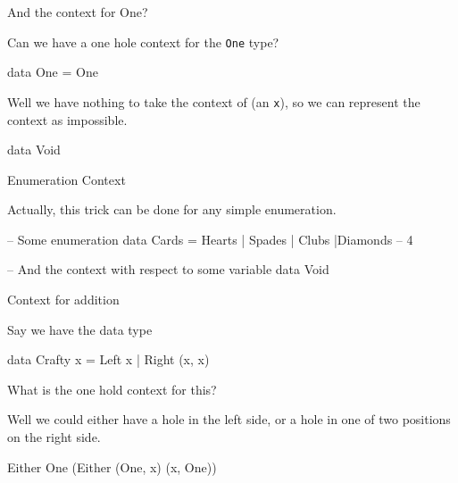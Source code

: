 \documentclass[ignorenonframetext,]{beamer}
\begin{document}
\begin{frame}[fragile]{And the context for One?}

Can we have a one hole context for the \texttt{One} type?

\begin{haskellcode}
data One = One
\end{haskellcode}

\pause

Well we have nothing to take the context of (an \texttt{x}), so we can
represent the context as impossible.

\begin{haskellcode}
data Void
\end{haskellcode}

\end{frame}

\begin{frame}[fragile]{Enumeration Context}

Actually, this trick can be done for any simple enumeration.

\begin{haskellcode}
-- Some enumeration
data Cards = Hearts | Spades | Clubs |Diamonds -- 4
\end{haskellcode}

\pause

\begin{haskellcode}
-- And the context with respect to some variable
data Void
\end{haskellcode}

\end{frame}

\begin{frame}[fragile]{Context for addition}

Say we have the data type

\begin{haskellcode}
data Crafty x = Left x | Right (x, x)
\end{haskellcode}

What is the one hold context for this?

\pause

Well we could either have a hole in the left side, or a hole in one of
two positions on the right side.

\begin{haskellcode}
Either One (Either (One, x) (x, One))
\end{haskellcode}

\end{frame}
\end{document}
